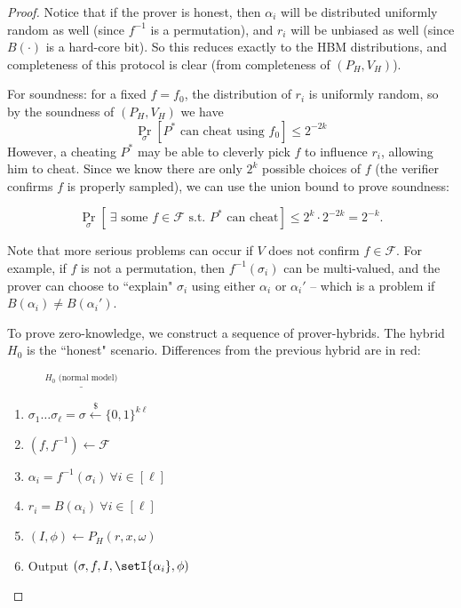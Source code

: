 \documentclass[12pt]{tufte-book}
\begin{document}
\begin{proof}
Notice that if the prover is honest, then $\alpha_i$ will be distributed
uniformly random as well (since $f^{-1}$ is a permutation), and $r_i$ will be
unbiased as well (since $B(\cdot)$ is a hard-core bit). So this reduces exactly
to the HBM distributions, and completeness of this protocol is clear (from completeness of
$(P_H, V_H)$).

For soundness: for a fixed $f = f_0$, the distribution of $r_i$ is
uniformly random, so by the soundness of $(P_H, V_H)$ we have
$$\Pr_\sigma[\text{$P^*$ can cheat using $f_0$}] \leq 2^{-2k}$$
However, a cheating $P^*$ may be able to cleverly pick $f$ to influence $r_i$,
allowing him to cheat. Since we know there are only $2^k$ possible choices of
$f$ (the verifier confirms $f$ is properly sampled), we can use the union bound
to prove soundness:

$$\Pr_\sigma[~\exists \text{ some $f \in \mathcal{F}$ s.t. $P^*$ can cheat}] \leq 2^{k} \cdot 2^{-2k} = 2^{-k}.$$

Note that more serious problems can occur if $V$ does not confirm $f\in \mathcal{F}$. For example, if $f$ is not a permutation, then
$f^{-1}(\sigma_i)$ can be multi-valued, and the prover can choose to ``explain"
$\sigma_i$ using either $\alpha_i$ or $\alpha_i'$ -- which is a problem if
$B(\alpha_i) \neq B(\alpha_i')$.


To prove zero-knowledge, we construct a sequence of prover-hybrids. The hybrid $H_0$ is the ``honest" scenario. Differences from the previous hybrid are in red:



\newcommand{\htitle}[1]{\vspace{0.3cm}$\overset{#1}{\underline{\hspace{5cm}}}$}
\newcommand{\diff}[1]{{\color{red} #1}}

\htitle{H_0 \text{ (normal model)}}
\begin{enumerate}
    \item $\sigma_1\hdots\sigma_\ell = \sigma \xleftarrow{\$} \{0,1\}^{k\ell}$
    \item $(f, f^{-1}) \gets \mathcal{F}$
    \item $\alpha_i = f^{-1}(\sigma_i) ~\forall i \in [\ell]$
    \item $r_i = B(\alpha_i) ~\forall i \in [\ell]$
    \item $(I, \phi) \gets P_H(r, x, \omega)$
    \item Output $(\sigma, f, I, \setI{\alpha_i}, \phi)$
\end{enumerate}


\end{proof}
\end{document}
